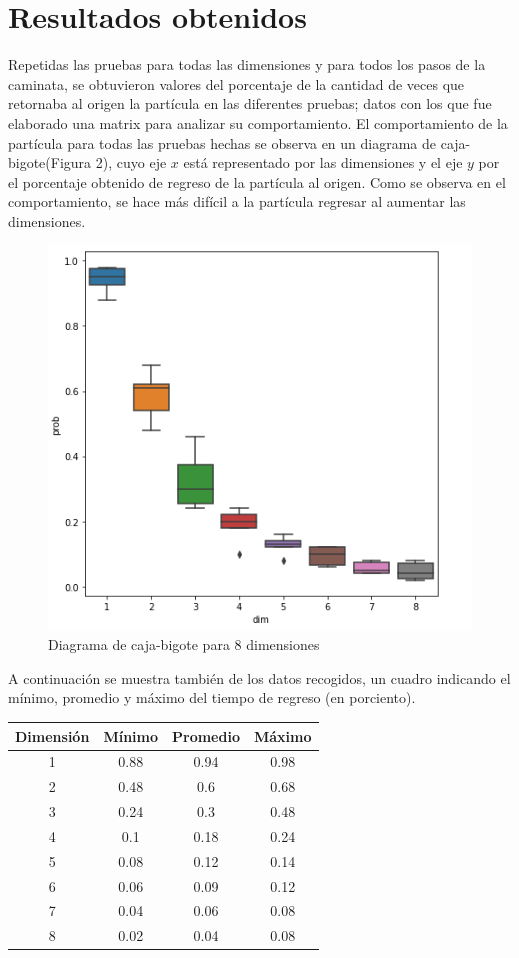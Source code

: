 \documentclass{article}
\begin{document}
\section{Resultados obtenidos}
Repetidas las pruebas para todas las dimensiones y para todos los pasos de la caminata, se obtuvieron valores del porcentaje de la cantidad de veces que retornaba al origen la partícula en las diferentes pruebas; datos con los que fue elaborado una matrix para analizar su comportamiento. El comportamiento de la partícula para todas las pruebas hechas se observa en un diagrama de caja-bigote(Figura 2), cuyo eje $x$ está representado por las dimensiones y el eje $y$ por el porcentaje obtenido de regreso de la partícula al origen. Como se observa en el comportamiento, se hace más difícil a la partícula regresar al  aumentar las dimensiones.  

\begin{figure}[H]
    \centering

    \includegraphics[scale=0.7]{Caja.png}
    \caption{Diagrama de caja-bigote para 8 dimensiones}
    \label{fig:f2}
\end{figure}

A continuación se muestra también de los datos recogidos, un cuadro indicando el mínimo, promedio y máximo del tiempo de regreso (en porciento).
\begin{center}
\begin{tabular}{|c|c|c|c|}
\hline 
Dimensión & Mínimo & Promedio & Máximo \\ 
\hline 
1 & 0.88 & 0.94 & 0.98 \\ 
\hline 
2 & 0.48 & 0.6 & 0.68 \\ 
\hline 
3 & 0.24 & 0.3 & 0.48 \\ 
\hline 
4 & 0.1 & 0.18 & 0.24 \\ 
\hline 
5 & 0.08 & 0.12 & 0.14 \\ 
\hline 
6 & 0.06 & 0.09 & 0.12 \\ 
\hline 
7 & 0.04 & 0.06 & 0.08 \\ 
\hline 
8 & 0.02 & 0.04 & 0.08 \\ 
\hline 
\end{tabular} 
\end{center}
\end{document}
